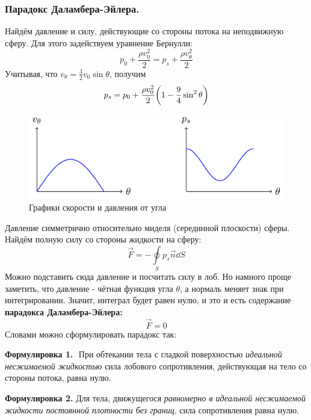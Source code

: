 \subsubsection{Парадокс Даламбера-Эйлера.} Найдём давление и силу, 
действующие со стороны потока на неподвижную сферу. Для этого задействуем
 уравнение Бернулли:
\begin{equation}
    p_0 + \frac{\rho v_0^2}{2} = 
    p_s + \frac{\rho v_\theta^2}{2}
\end{equation}
Учитывая, что $v_\theta=\frac{3}{2}v_0\sin\theta$, получим
\begin{equation}
    p_s = p_0 + \frac{\rho v_0^2}{2}\qty(1-\frac{9}{4}\sin^2\theta)
\end{equation}
\begin{figure}[H]
    \centering
    \includegraphics[width=\textwidth]{img/p_vtheta}
    \caption{Графики скорости и давления от угла}
    \label{fig:pandv}
\end{figure}
Давление симметрично относительно миделя (серединной плоскости) сферы. Найдём полную силу со стороны жидкости на сферу:
\begin{equation}
    \vec{F} = - \oint\limits_S p_s \vec{n} \dd{S}
\end{equation}
Можно подставить сюда давление и посчитать силу в лоб. Но намного проще
 заметить, что давление - чётная функция угла $\theta$, а нормаль 
 меняет знак при интегрировании. Значит, интеграл будет равен нулю, и
 это и есть содержание \textbf{парадокса Даламбера-Эйлера:}
 \begin{equation}
     \vec{F}=0
 \end{equation}
Словами можно сформулировать парадокс так:

\textbf{Формулировка 1.\,\, }{При обтекании тела с гладкой поверхностью \textit{идеальной несжимаемой
    жидкостью} сила лобового сопротивления, действующая на тело со
стороны потока, равна нулю.}


\textbf{Формулировка 2. }{Для тела, движущегося \textit{равномерно в идеальной несжимаемой
    жидкости постоянной плотности без границ}, сила сопротивления
равна нулю.}

